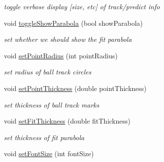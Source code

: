 \begin{DoxyCompactItemize}
\begin{DoxyCompactList}\small\item\em toggle verbose display \mbox{[}size, etc\mbox{]} of track/predict info \end{DoxyCompactList}\item 
void \hyperlink{classProjectorWindow_a651ec38c851034cc5c5ada4672decbcf}{toggle\+Show\+Parabola} (bool show\+Parabola)\hypertarget{classProjectorWindow_a651ec38c851034cc5c5ada4672decbcf}{}\label{classProjectorWindow_a651ec38c851034cc5c5ada4672decbcf}

\begin{DoxyCompactList}\small\item\em set whether we should show the fit parabola \end{DoxyCompactList}\item 
void \hyperlink{classProjectorWindow_ae8bc9628b44960aea29159f254f8a154}{set\+Point\+Radius} (int point\+Radius)\hypertarget{classProjectorWindow_ae8bc9628b44960aea29159f254f8a154}{}\label{classProjectorWindow_ae8bc9628b44960aea29159f254f8a154}

\begin{DoxyCompactList}\small\item\em set radius of ball track circles \end{DoxyCompactList}\item 
void \hyperlink{classProjectorWindow_adb3879abf4868d33289cb52463b31ee1}{set\+Point\+Thickness} (double point\+Thickness)\hypertarget{classProjectorWindow_adb3879abf4868d33289cb52463b31ee1}{}\label{classProjectorWindow_adb3879abf4868d33289cb52463b31ee1}

\begin{DoxyCompactList}\small\item\em set thickness of ball track marks \end{DoxyCompactList}\item 
void \hyperlink{classProjectorWindow_af676564726fcbf902e3a1971a3b12099}{set\+Fit\+Thickness} (double fit\+Thickness)\hypertarget{classProjectorWindow_af676564726fcbf902e3a1971a3b12099}{}\label{classProjectorWindow_af676564726fcbf902e3a1971a3b12099}

\begin{DoxyCompactList}\small\item\em set thickness of fit parabola \end{DoxyCompactList}\item 
void \hyperlink{classProjectorWindow_a05bbf26094bb7e4389049e7314b95a88}{set\+Font\+Size} (int font\+Size)\hypertarget{classProjectorWindow_a05bbf26094bb7e4389049e7314b95a88}{}\label{classProjectorWindow_a05bbf26094bb7e4389049e7314b95a88}


\end{DoxyCompactItemize}
